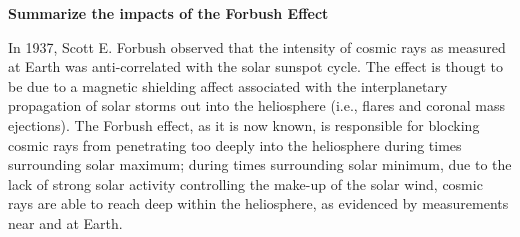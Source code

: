 \textbf{Summarize the impacts of the Forbush Effect}

In 1937, Scott E. Forbush observed that the intensity of cosmic rays as
measured at Earth was anti-correlated with the solar sunspot cycle. The
effect is thougt to be due to a magnetic shielding affect associated
with the interplanetary propagation of solar storms out into the
heliosphere (i.e., flares and
coronal mass ejections). The Forbush effect, as it is now known, is
responsible for blocking cosmic rays from penetrating too deeply into
the heliosphere during times surrounding solar
maximum; during times surrounding solar minimum, due to the lack of
strong solar activity controlling the make-up of the solar wind, cosmic
rays are able to reach deep within the heliosphere, as evidenced by
measurements near and at Earth. 



